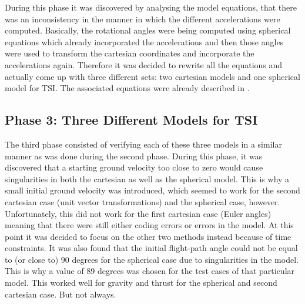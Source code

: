 During this phase it was discovered by analysing the model equations, that there was an inconsistency in the manner in which the different accelerations were computed. Basically, the rotational angles were being computed using spherical equations which already incorporated the accelerations and then those angles were used to transform the cartesian coordinates and incorporate the accelerations again. Therefore it was decided to rewrite all the equations and actually come up with three different sets: two cartesian models and one spherical model for \ac{TSI}. The associated equations were already described in .

\subsection{Phase 3: Three Different Models for \ac{TSI}}
\label{subsec:phase3com}
The third phase consisted of verifying each of these three models in a similar manner as was done during the second phase. During this phase, it was discovered that a starting ground velocity too close to zero would cause singularities in both the cartesian as well as the spherical model. This is why a small initial ground velocity was introduced, which seemed to work for the second cartesian case (unit vector transformations) and the spherical case, however. Unfortunately, this did not work for the first cartesian case (Euler angles) meaning that there were still either coding errors or errors in the model. At this point it was decided to focus on the other two methods instead because of time constraints. It was also found that the initial flight-path angle could not be equal to (or close to) 90 degrees for the spherical case due to singularities in the model. This is why a value of 89 degrees was chosen for the test cases of that particular model. This worked well for gravity and thrust for the spherical and second cartesian case. But not always.


